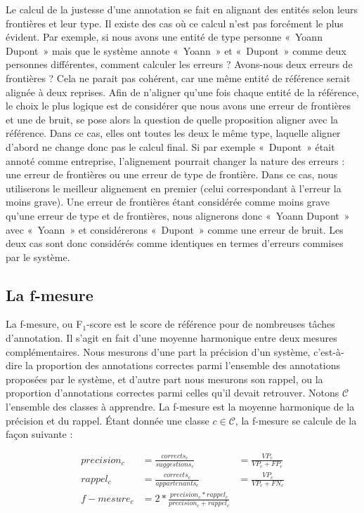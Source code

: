 \documentclass[12pt,a4paper,times,twoside,openright]{report}
\begin{document}
Le calcul de la justesse d'une annotation se fait en alignant des entités selon leurs frontières et leur type. Il existe des cas où ce calcul n'est pas forcément le plus évident. Par exemple, si nous avons une entité de type personne «\ Yoann Dupont\ » mais que le système annote «\ Yoann\ » et «\ Dupont\ » comme deux personnes différentes, comment calculer les erreurs ? Avons-nous deux erreurs de frontières ? Cela ne parait pas cohérent, car une même entité de référence serait alignée à deux reprises. Afin de n'aligner qu'une fois chaque entité de la référence, le choix le plus logique est de considérer que nous avons une erreur de frontières et une de bruit, se pose alors la question de quelle proposition aligner avec la référence. Dans ce cas, elles ont toutes les deux le même type, laquelle aligner d'abord ne change donc pas le calcul final. Si par exemple «\ Dupont\ » était annoté comme entreprise, l'alignement pourrait changer la nature des erreurs : une erreur de frontières ou une erreur de type de frontière. Dans ce cas, nous utiliserons le meilleur alignement en premier (celui correspondant à l'erreur la moins grave). Une erreur de frontières étant considérée comme moins grave qu'une erreur de type et de frontières, nous alignerons donc «\ Yoann Dupont\ » avec «\ Yoann\ » et considérerons «\ Dupont\ » comme une erreur de bruit. Les deux cas sont donc considérés comme identiques en termes d'erreurs commises par le système.

\subsection{La f-mesure}

La f-mesure, ou F$_{1}$-score \citep{van1979information} est le score de référence pour de nombreuses tâches d'annotation. Il s'agit en fait d'une moyenne harmonique entre deux mesures complémentaires. Nous mesurons d'une part la précision d'un système, c'est-à-dire la proportion des annotations correctes parmi l'ensemble des annotations proposées par le système, et d'autre part nous mesurons son rappel, ou la proportion d'annotations correctes parmi celles qu'il devait retrouver. Notons $\mathcal{C}$ l'ensemble des classes à apprendre. La f-mesure est la moyenne harmonique de la précision et du rappel. Étant donnée une classe $c \in \mathcal{C}$, la f-mesure se calcule de la façon suivante :

\begin{equation}\label{eq:f1score-one-class}
\begin{aligned}
precision_{c} &= \frac{corrects_{c}}{suggestions_{c}} &= \frac{VP_{c}}{VP_{c} + FP_{c}}\\
rappel_{c} &= \frac{corrects_{c}}{appartenants_{c}} &= \frac{VP_{c}}{VP_{c} + FN_{c}} \\
f-mesure_{c} &= 2 * \frac{precision_{c} * rappel_{c}}{precision_{c} + rappel_{c}} \\
\end{aligned}
\end{equation}
\end{document}
